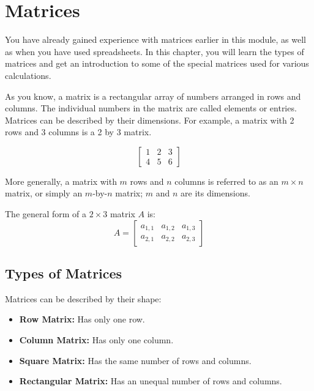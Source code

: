 \chapter{Matrices}
You have already gained experience with matrices earlier in this module, as well as when you have used spreadsheets. In this chapter, you will learn the types of matrices and get an introduction to some of the special matrices used for various calculations. 

As you know, a matrix is a rectangular array of numbers arranged in rows and columns. The individual numbers in the matrix are called elements or entries. Matrices can be described by their dimensions. For example, a matrix with 2 rows and 3 columns is a 2 by 3 matrix.

$$\begin{bmatrix}
1 & 2 & 3\\
4 & 5 & 6 
\end{bmatrix}
$$

More generally, a matrix with $m$ rows and $n$ columns is referred to as an $m \times n$ matrix, or simply an $m$-by-$n$ matrix; $m$ and $n$ are its dimensions.

The general form of a $2 \times 3$ matrix $A$ is:
$$
A = \begin{bmatrix}
a_{1,1} & a_{1,2} & a_{1,3} \\
a_{2,1} & a_{2,2} & a_{2,3}
\end{bmatrix}
$$

\section{Types of Matrices}
Matrices can be described by their shape:
\begin{itemize}
	\item \textbf{Row Matrix:} Has only one row.
	\item \textbf{Column Matrix:} Has only one column.
	\item \textbf{Square Matrix:} Has the same number of rows and columns.
	\item \textbf{Rectangular Matrix:} Has an unequal number of rows and columns.
\end{itemize}


